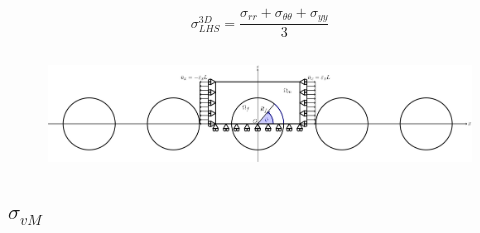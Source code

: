\documentclass[first,firstsupp,lastsupp,last,hyperref,table]{ETHclass}
\begin{document}
\begin{frame}
\begin{columns}[c]
\begin{column}{0.5\textwidth}
\begin{figure}
\end{figure}
\vspace{-0.5cm}
\scriptsize
\begin{equation*}
\sigma^{3D}_{LHS}=\frac{\sigma_{rr}+\sigma_{\theta\theta}+\sigma_{yy}}{3}
\end{equation*}
\end{column}
\end{columns}
\vspace{-0.45cm}
\centering
\begin{figure}
\centering
\includegraphics[width=\textwidth]{refAngle.pdf}
\end{figure}
\end{frame}

\subsection{$\sigma_{vM}$}
\end{document}
